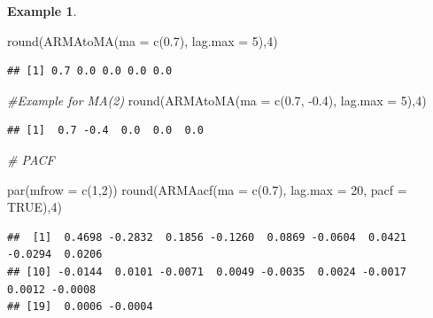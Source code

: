 \documentclass[
]{book}
\newenvironment{Shaded}{\begin{snugshade}}{\end{snugshade}}
\newcommand{\AttributeTok}[1]{\textcolor[rgb]{0.77,0.63,0.00}{#1}}
\newcommand{\CommentTok}[1]{\textcolor[rgb]{0.56,0.35,0.01}{\textit{#1}}}
\newcommand{\ConstantTok}[1]{\textcolor[rgb]{0.00,0.00,0.00}{#1}}
\newcommand{\DecValTok}[1]{\textcolor[rgb]{0.00,0.00,0.81}{#1}}
\newcommand{\FloatTok}[1]{\textcolor[rgb]{0.00,0.00,0.81}{#1}}
\newcommand{\FunctionTok}[1]{\textcolor[rgb]{0.00,0.00,0.00}{#1}}
\newcommand{\NormalTok}[1]{#1}
\newcommand{\SpecialCharTok}[1]{\textcolor[rgb]{0.00,0.00,0.00}{#1}}
\theoremstyle{definition}
\theoremstyle{definition}
\newtheorem{example}{Example}[chapter]
\theoremstyle{definition}
\theoremstyle{definition}
\theoremstyle{remark}
\begin{document}
\begin{example}
\begin{Shaded}
\begin{Highlighting}[]
\FunctionTok{round}\NormalTok{(}\FunctionTok{ARMAtoMA}\NormalTok{(}\AttributeTok{ma =} \FunctionTok{c}\NormalTok{(}\FloatTok{0.7}\NormalTok{), }\AttributeTok{lag.max =} \DecValTok{5}\NormalTok{),}\DecValTok{4}\NormalTok{)}
\end{Highlighting}
\end{Shaded}

\begin{verbatim}
## [1] 0.7 0.0 0.0 0.0 0.0
\end{verbatim}

\begin{Shaded}
\begin{Highlighting}[]
\CommentTok{\#Example for MA(2)}
\FunctionTok{round}\NormalTok{(}\FunctionTok{ARMAtoMA}\NormalTok{(}\AttributeTok{ma =} \FunctionTok{c}\NormalTok{(}\FloatTok{0.7}\NormalTok{, }\SpecialCharTok{{-}}\FloatTok{0.4}\NormalTok{), }\AttributeTok{lag.max =} \DecValTok{5}\NormalTok{),}\DecValTok{4}\NormalTok{)}
\end{Highlighting}
\end{Shaded}

\begin{verbatim}
## [1]  0.7 -0.4  0.0  0.0  0.0
\end{verbatim}

\begin{Shaded}
\begin{Highlighting}[]
\CommentTok{\# PACF}

\FunctionTok{par}\NormalTok{(}\AttributeTok{mfrow =} \FunctionTok{c}\NormalTok{(}\DecValTok{1}\NormalTok{,}\DecValTok{2}\NormalTok{))}
\FunctionTok{round}\NormalTok{(}\FunctionTok{ARMAacf}\NormalTok{(}\AttributeTok{ma =} \FunctionTok{c}\NormalTok{(}\FloatTok{0.7}\NormalTok{), }\AttributeTok{lag.max =} \DecValTok{20}\NormalTok{, }\AttributeTok{pacf =} \ConstantTok{TRUE}\NormalTok{),}\DecValTok{4}\NormalTok{)}
\end{Highlighting}
\end{Shaded}

\begin{verbatim}
##  [1]  0.4698 -0.2832  0.1856 -0.1260  0.0869 -0.0604  0.0421 -0.0294  0.0206
## [10] -0.0144  0.0101 -0.0071  0.0049 -0.0035  0.0024 -0.0017  0.0012 -0.0008
## [19]  0.0006 -0.0004
\end{verbatim}


\end{example}
\end{document}
